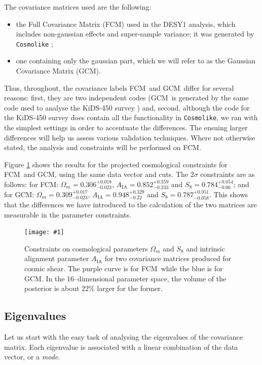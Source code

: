 \documentclass[twocolumn]{\docclass}
\newcommand{\sfig}[2]{
	\texttt{[image: \#1]}
}
\newcommand{\Sfig}[2]{
	\begin{figure}[thbp]
		\sfig{../figures/#1.pdf}{\columnwidth}
		\caption{{\small #2}}
		\label{fig:#1}
	\end{figure}
}
\newcommand{\rf}[1]{Figure \ref{fig:#1}}
\newcommand\full{FCM}
\newcommand\gaussian{GCM}
\begin{document}
	
	The covariance matrices used are the following:
	\begin{itemize}
		\item the Full Covariance Matrix (\full) used in the DESY1 analysis, which includes non-gaussian effects and super-sample variance; it was generated by {\tt Cosmolike} \citep{Krause:2016jvl};
		\item one containing only the gaussian part, which we will refer to as the Gaussian Covariance Matrix (\gaussian).
	\end{itemize}
	Thus, throughout, the covariance labels \full\ and \gaussian\ differ for several reasons: first, they are two independent codes (\gaussian\ is generated by the same code used to analyse the KiDS-450 survey \citep{Kohlinger:2017sxk})
	and, second, although the code for the KiDS-450 survey does contain all the functionality in {\tt Cosmolike}, we ran with the simplest settings in order to accentuate the differences. The ensuing larger differences will help us assess various validation techniques. Where not otherwise stated, the analysis and constraints will be performed on \full.
	
	\rf{Y1-constraints_wmS8A} shows the results for the projected cosmological constraints for \full\ and \gaussian, using the same data vector and cuts. The $2\sigma$ constraints are as follows: for \full: $\Omega_m = 0.306^{+ 0.018}_{- 0.023}$, $A_{\mathrm{IA}} = 0.852^{+ 0.359}_{- 0.233}$ and $S_8 = 0.784^{+ 0.054}_{- 0.06}$; and for \gaussian: $\Omega_m = 0.309^{+ 0.017}_{- 0.023}$, $A_{\mathrm{IA}} = 0.948^{+ 0.329}_{- 0.22}$ and $S_8 = 0.787^{+ 0.051}_{- 0.058}$. This shows that the differences we have introduced to the calculation of the two matrices are measurable in the parameter constraints.
	
	\Sfig{Y1-constraints_wmS8A}{Constraints on cosmological parameters $\Omega_m$ and $S_8$ and intrinsic alignment parameter $A_{\mathrm{IA}}$ for two covariance matrices produced for cosmic shear. The purple curve is for \full\ while the blue is for \gaussian. In the 16--dimensional parameter space, the volume of the posterior is about $22\%$ larger for the former.}
	
	\subsection{Eigenvalues}
	\label{subsec:eigenvalues}
	
	Let us start with the easy task of analysing the eigenvalues of the covariance matrix. Each eigenvalue is associated with a linear combination of the data vector, or a \emph{mode}.
	
\end{document}
